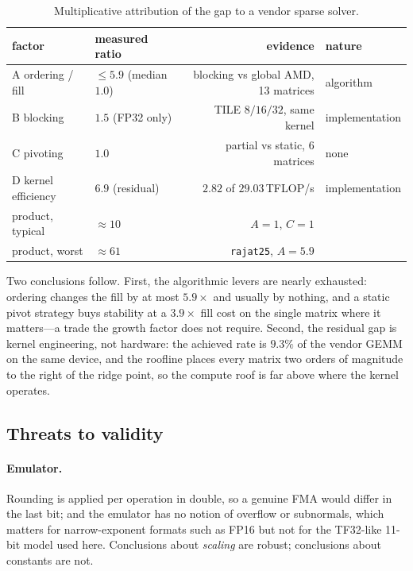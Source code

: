 \begin{table}[t]
  \centering
  \small
  \caption{Multiplicative attribution of the gap to a vendor sparse solver.}
  \label{tab:attrib}
  \begin{tabular}{llrl}
    \toprule
    factor & measured ratio & evidence & nature \\
    \midrule
    A ordering / fill   & $\le 5.9$ (median $1.0$) & blocking vs global AMD, 13 matrices & algorithm \\
    B blocking          & $1.5$ (FP32 only)        & TILE $8/16/32$, same kernel          & implementation \\
    C pivoting          & $1.0$                    & partial vs static, 6 matrices        & none \\
    D kernel efficiency & $6.9$ (residual)         & $2.82$ of $29.03$\,TFLOP/s           & implementation \\
    \midrule
    product, typical & $\approx 10$ & $A=1$, $C=1$ & \\
    product, worst   & $\approx 61$ & \texttt{rajat25}, $A=5.9$ & \\
    \bottomrule
  \end{tabular}
\end{table}

Two conclusions follow. First, the algorithmic levers are nearly exhausted:
ordering changes the fill by at most $5.9\times$ and usually by nothing, and a
static pivot strategy buys stability at a $3.9\times$ fill cost on the single
matrix where it matters---a trade the growth factor does not require. Second,
the residual gap is kernel engineering, not hardware: the achieved rate is
$9.3\%$ of the vendor GEMM on the same device, and the roofline places every
matrix two orders of magnitude to the right of the ridge point, so the compute
roof is far above where the kernel operates.

\subsection{Threats to validity}

\paragraph{Emulator.}
Rounding is applied per operation in double, so a genuine FMA would differ in
the last bit; and the emulator has no notion of overflow or subnormals, which
matters for narrow-exponent formats such as FP16 but not for the TF32-like
11-bit model used here. Conclusions about \emph{scaling} are robust; conclusions
about constants are not.

